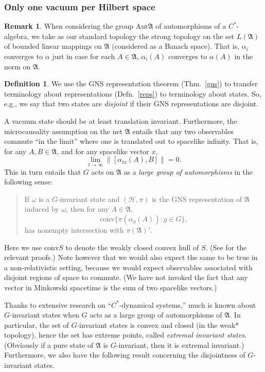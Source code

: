 \documentclass[11pt]{article}
\newcommand{\alg}[1]{\mathfrak{#1}}
\newcommand{\norm}[1]{\| #1\|}
\theoremstyle{definition}
\theoremstyle{definition}
\newtheorem{defn}[thm]{Definition}
\newtheorem{note}[thm]{Remark}
\theoremstyle{remark}
\def\2#1{{\mathcal #1}}
\def\a{\alpha} \def\b{\beta} \def\g{\gamma} \def\d{\delta}
\def\om{\omega} \def\Om{\Omega} \def\dd{\partial} \def\D{\Delta}
\newcommand{\Aut}{\mathrm{Aut}}
\begin{document}
\subsubsection{Only one vacuum per Hilbert space} \label{vacuum}

\begin{note} When considering the group $\Aut \alg{A}$ of
  automorphisms of a $C^*$-algebra, we take as our standard topology
  the strong topology on the set $L(\alg{A})$ of bounded linear
  mappings on $\alg{A}$ (considered as a Banach space).  That is, $\a
  _i$ converges to $\a$ just in case for each $A\in \alg{A}$, $\a
  _i(A)$ converges to $\a (A)$ in the norm on $\alg{A}$.  \end{note}

\begin{defn} We use the GNS representation theorem (Thm.\ \ref{gns})
  to transfer terminology about representations (Defn.\ \ref{reps}) to
  terminology about states.  So, e.g., we say that two states are
  \emph{disjoint} if their GNS representations are disjoint.
\end{defn}

A vacuum state should be at least translation invariant.  Furthermore,
the microcausality assumption on the net $\alg{A}$ entails that any
two observables commute ``in the limit'' where one is translated out
to spacelike infinity.  That is, for any $A,B\in \alg{A}$, and for any
spacelike vector $x$, $$ \lim _{t\rightarrow \infty}\norm{ [\a
  _{tx}(A),B] } =0 .$$ This in turn entails that $G$ acts on $\alg{A}$
as a \emph{large group of automorphisms} in the following sense:
\begin{quote} If $\om$ is a $G$-invariant state and $(\2H ,\pi )$ is
  the GNS representation of $\alg{A}$ induced by $\om$, then for any
  $A\in \alg{A}$, $$ \overline{\mathrm{conv}}\bigl\{ \pi (\a
  _g(A)):g\in G \bigr\} , $$ has nonempty intersection with $\pi
  (\alg{A})'$.  \end{quote} Here we use $\overline{\mathrm{conv}}S$ to
denote the weakly closed convex hull of $S$.  (See \cite{storm} for
the relevant proofs.)  Note however that we would also expect the same
to be true in a non-relativistic setting, because we would expect
observables associated with disjoint regions of space to commute.  (We
have not invoked the fact that any vector in Minkowski spacetime is
the sum of two spacelike vectors.)

Thanks to extensive research on ``$C^*$-dynamical systems,'' much is
known about $G$-invariant states when $G$ acts as a large group of
automorphisms of $\alg{A}$.  In particular, the set of $G$-invariant
states is convex and closed (in the weak* topology), hence the set has
extreme points, called \emph{extremal invariant states}.  (Obviously
if a pure state of $\alg{A}$ is $G$-invariant, then it is extremal
invariant.)  Furthermore, we also have the following result concerning
the disjointness of $G$-invariant states.
\end{document}
